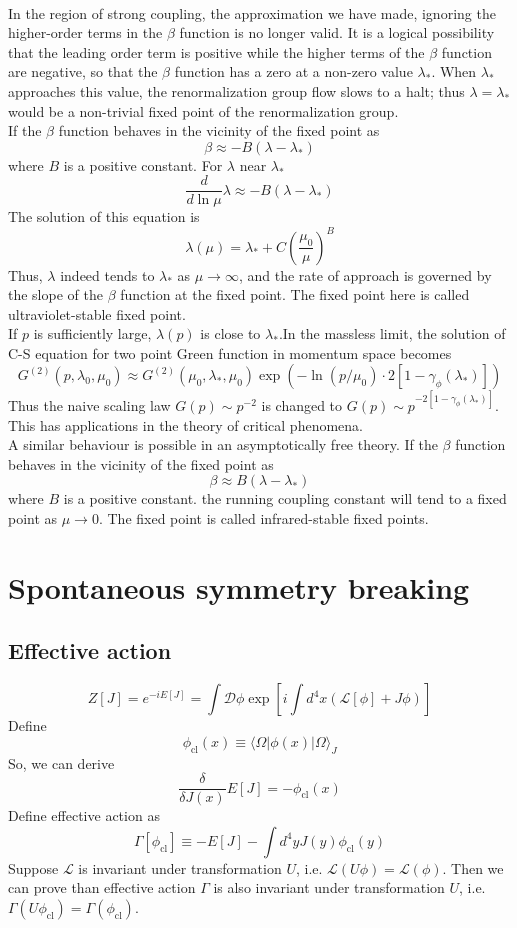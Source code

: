 \documentclass[cyan]{elegantnote}
\begin{document}
\\
In the region of strong coupling, the approximation we have made, ignoring the higher-order terms in the $\beta$ function is no longer valid. It is a logical possibility that the leading order term is positive while the higher terms of the $\beta$ function are negative, so that the $\beta$ function has a zero at a non-zero value $\lambda_*$. When $\lambda_*$ approaches this value, the renormalization group flow slows to a halt; thus $\lambda = \lambda_*$ would be a non-trivial fixed point of the renormalization group. 
\\
If the $\beta$ function behaves in the vicinity of the fixed point as 
\[\beta \approx -B(\lambda - \lambda_*)\] 
where $B$ is a positive constant. For $\lambda$ near $\lambda_*$ 
\[\frac{d}{d\ln \mu} \lambda \approx -B(\lambda-\lambda_*)\]
The solution of this equation is
\[\lambda(\mu) = \lambda_* + C(\frac{\mu_0}{\mu})^B\]
Thus, $\lambda$ indeed tends to $\lambda_*$ as $\mu \to \infty$, and the rate of approach is governed by the slope of the $\beta$ function at the fixed point. The fixed point here is called ultraviolet-stable fixed point. 
\\
If $p$ is sufficiently large, $\lambda(p)$ is close to $\lambda_*$.In the massless limit, the solution of C-S equation for two point Green function in momentum space becomes
\[G^{(2)}(p,\lambda_0,\mu_0) \approx G^{(2)}(\mu_0,\lambda_*,\mu_0)\exp \left (- \ln(p/\mu_0) \cdot 2[1-\gamma_{\phi}(\lambda_*)] \right )\]
Thus the naive scaling law $G(p) \sim p^{-2}$ is changed to $G(p) \sim p^{-2[1-\gamma_{\phi}(\lambda_*)]}$. This has applications in the theory of critical phenomena.
\\
A similar behaviour is possible in an asymptotically free theory. If the $\beta$ function behaves in the vicinity of the fixed point as 
\[\beta \approx B(\lambda - \lambda_*)\] 
where $B$ is a positive constant.
the running coupling constant will tend to a fixed point as $\mu \to 0$.  The fixed point is called infrared-stable fixed points. 

\section{Spontaneous symmetry breaking}
\subsection{Effective action}
\[Z[J] = e^{-iE[J]} = \int \mathcal{D} \phi \exp\left[ i\int d^4x (\mathcal{L}[\phi] + J \phi) \right]\]
Define 
\[\phi_{\mathrm{cl}} (x) \equiv \langle \Omega | \phi(x) | \Omega \rangle_{J}\]
So, we can derive
\[\frac{\delta}{\delta J(x)} E[J] = - \phi_{\mathrm{cl}}(x)\]
Define effective action as
\[\Gamma[\phi_{\mathrm{cl}}] \equiv -E[J] - \int d^4y J(y) \phi_{\mathrm{cl}}(y)\]
Suppose $\mathcal{L}$ is invariant under transformation $U$, i.e. $\mathcal{L}(U\phi) = \mathcal{L}(\phi) $. Then we can prove than effective action $\Gamma$ is also invariant under transformation $U$, i.e. $\Gamma(U\phi_{\mathrm{cl}}) = \Gamma(\phi_{\mathrm{cl}}) $.
\end{document}
